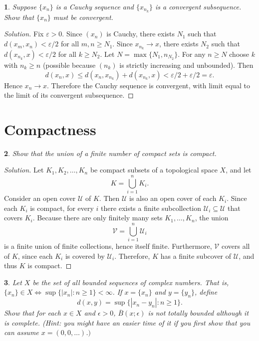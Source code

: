 \documentclass[12pt, a4paper]{report}
\theoremstyle{spaced}
\newtheorem{exercise}{}
\newcommand{\setexercise}[1]{\setcounter{exercise}{#1-1}}
\begin{document}
\setexercise{8}
\begin{exercise}
	Suppose $\{x_n\}$ is a Cauchy sequence and $\{x_{n_k}\}$ is a convergent subsequence.
	Show that $\{x_n\}$ must be convergent.
\end{exercise}

\begin{proof}[Solution]
	Fix $\varepsilon>0$. Since $(x_n)$ is Cauchy, there exists $N_1$ such that
	$d(x_m,x_n)<\varepsilon/2$ for all $m,n\ge N_1$.
	Since $x_{n_k}\to x$, there exists $N_2$ such that
	$d(x_{n_k},x)<\varepsilon/2$ for all $k\ge N_2$.
	Let $N=\max\{N_1,n_{N_2}\}$. For any $n\ge N$ choose $k$ with $n_k\ge n$
	(possible because $(n_k)$ is strictly increasing and unbounded). Then
	\[
		d(x_n,x)\le d(x_n,x_{n_k})+d(x_{n_k},x)
		< \varepsilon/2+\varepsilon/2=\varepsilon.
	\]
	Hence $x_n\to x$. Therefore the Cauchy sequence is convergent, with limit equal
	to the limit of its convergent subsequence.
\end{proof}

\section{Compactness}

\setexercise{4}
\begin{exercise}
	Show that the union of a finite number of compact sets is compact.
\end{exercise}

\begin{proof}[Solution]
	Let \(K_1, K_2, \dots, K_n\) be compact subsets of a topological space \(X\), and let
	\[
		K = \bigcup_{i=1}^{n} K_i.
	\]
	Consider an open cover \(\mathcal{U}\) of \(K\).
	Then \(\mathcal{U}\) is also an open cover of each \(K_i\).
	Since each \(K_i\) is compact, for every \(i\) there exists a finite subcollection
	\(\mathcal{U}_i \subseteq \mathcal{U}\) that covers \(K_i\).
	Because there are only finitely many sets \(K_1, \dots, K_n\),
	the union
	\[
		\mathcal{V} = \bigcup_{i=1}^{n} \mathcal{U}_i
	\]
	is a finite union of finite collections, hence itself finite.
	Furthermore, \(\mathcal{V}\) covers all of \(K\), since each \(K_i\) is covered by \(\mathcal{U}_i\).
	Therefore, \(K\) has a finite subcover of \(\mathcal{U}\),
	and thus \(K\) is compact.
\end{proof}


\setexercise{5}
\begin{exercise}
	Let $X$ be the set of all bounded sequences of complex numbers. That is,
	$\{x_n\} \in X \iff \sup \{|x_n| : n \geq 1\} < \infty$. If $x = \{x_n\}$ and $y = \{y_n\}$, define
	\[
		d(x, y) = \sup \{|x_n - y_n| : n \geq 1\}.
	\]
	Show that for each $x \in X$ and $\epsilon > 0$, $\overline{B}(x;\epsilon)$ is not totally bounded although it is complete.
	(Hint: you might have an easier time of it if you first show that you can assume $x = (0,0,\dots)$.$)$
\end{exercise}
\end{document}
